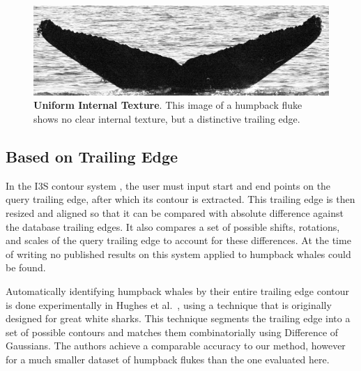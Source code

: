 
\begin{figure}[t]%
\centering
\includegraphics[width=1.0\textwidth]{../images/unclear_texture.jpg}
\caption[]{\textbf{Uniform Internal Texture}. This image of a humpback fluke shows no clear internal texture, but a distinctive trailing edge.}
\label{fig:unclear_texture}
\end{figure}



\subsection{Based on Trailing Edge}

In the I3S contour system \cite{i3scontour}, the user must input start and end points on the query trailing edge, after which its contour is extracted.
This trailing edge is then resized and aligned so that it can be compared with absolute difference against the database trailing edges.
It also compares a set of possible shifts, rotations, and scales of the query trailing edge to account for these differences.
At the time of writing no published results on this system applied to humpback whales could be found.

Automatically identifying humpback whales by their entire trailing edge contour is done experimentally in Hughes et al.\ \cite{hughes2015automated}, using a technique that is originally designed for great white sharks. 
This technique segments the trailing edge into a set of possible contours and matches them combinatorially using Difference of Gaussians.
The authors achieve a comparable accuracy to our method, however for a much smaller dataset of humpback flukes than the one evaluated here.

